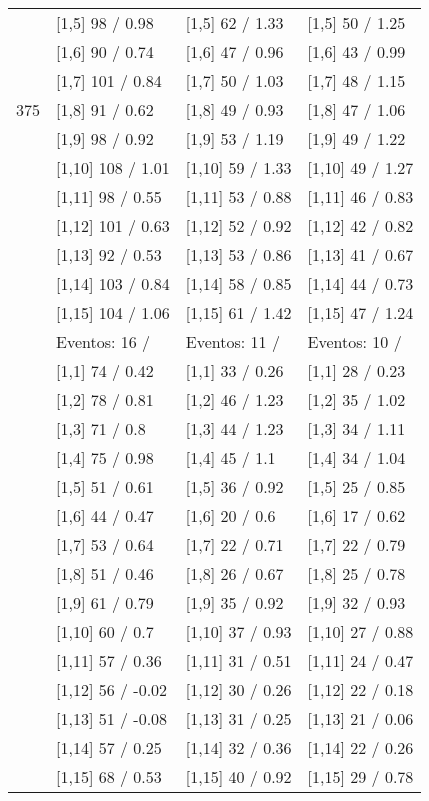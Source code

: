 \begin{table}
\begin{tabular}[t]{llll}
 & {}[1,5] 98  / 0.98 & {}[1,5] 62  / 1.33 & {}[1,5] 50  / 1.25\\
 & {}[1,6] 90  / 0.74 & {}[1,6] 47  / 0.96 & {}[1,6] 43  / 0.99\\
 & {}[1,7] 101  / 0.84 & {}[1,7] 50  / 1.03 & {}[1,7] 48  / 1.15\\
375 & {}[1,8] 91  / 0.62 & {}[1,8] 49  / 0.93 & {}[1,8] 47  / 1.06\\
\addlinespace
 & {}[1,9] 98  / 0.92 & {}[1,9] 53  / 1.19 & {}[1,9] 49  / 1.22\\
 & {}[1,10] 108  / 1.01 & {}[1,10] 59  / 1.33 & {}[1,10] 49  / 1.27\\
 & {}[1,11] 98  / 0.55 & {}[1,11] 53  / 0.88 & {}[1,11] 46  / 0.83\\
 & {}[1,12] 101  / 0.63 & {}[1,12] 52  / 0.92 & {}[1,12] 42  / 0.82\\
 & {}[1,13] 92  / 0.53 & {}[1,13] 53  / 0.86 & {}[1,13] 41  / 0.67\\
\addlinespace
 & {}[1,14] 103  / 0.84 & {}[1,14] 58  / 0.85 & {}[1,14] 44  / 0.73\\
 & {}[1,15] 104  / 1.06 & {}[1,15] 61  / 1.42 & {}[1,15] 47  / 1.24\\
 & Eventos:  16 / & Eventos:  11 / & Eventos:  10 /\\
 & {}[1,1] 74  / 0.42 & {}[1,1] 33  / 0.26 & {}[1,1] 28  / 0.23\\
 & {}[1,2] 78  / 0.81 & {}[1,2] 46  / 1.23 & {}[1,2] 35  / 1.02\\
\addlinespace
 & {}[1,3] 71  / 0.8 & {}[1,3] 44  / 1.23 & {}[1,3] 34  / 1.11\\
 & {}[1,4] 75  / 0.98 & {}[1,4] 45  / 1.1 & {}[1,4] 34  / 1.04\\
 & {}[1,5] 51  / 0.61 & {}[1,5] 36  / 0.92 & {}[1,5] 25  / 0.85\\
 & {}[1,6] 44  / 0.47 & {}[1,6] 20  / 0.6 & {}[1,6] 17  / 0.62\\
 & {}[1,7] 53  / 0.64 & {}[1,7] 22  / 0.71 & {}[1,7] 22  / 0.79\\
\addlinespace
500 & {}[1,8] 51  / 0.46 & {}[1,8] 26  / 0.67 & {}[1,8] 25  / 0.78\\
 & {}[1,9] 61  / 0.79 & {}[1,9] 35  / 0.92 & {}[1,9] 32  / 0.93\\
 & {}[1,10] 60  / 0.7 & {}[1,10] 37  / 0.93 & {}[1,10] 27  / 0.88\\
 & {}[1,11] 57  / 0.36 & {}[1,11] 31  / 0.51 & {}[1,11] 24  / 0.47\\
 & {}[1,12] 56  / -0.02 & {}[1,12] 30  / 0.26 & {}[1,12] 22  / 0.18\\
\addlinespace
 & {}[1,13] 51  / -0.08 & {}[1,13] 31  / 0.25 & {}[1,13] 21  / 0.06\\
 & {}[1,14] 57  / 0.25 & {}[1,14] 32  / 0.36 & {}[1,14] 22  / 0.26\\
 & {}[1,15] 68  / 0.53 & {}[1,15] 40  / 0.92 & {}[1,15] 29  / 0.78\\
\bottomrule
\end{tabular}
\end{table}
